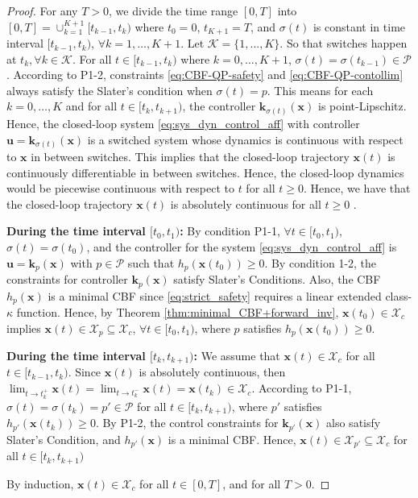 \documentclass[letterpaper, 10 pt, conference]{ieeeconf}  %
\begin{document}
\begin{proof}
    For any $T>0$, we divide the time range $[0, T]$ into $[0, T]=\cup_{k=1}^{K+1}[t_{k-1}, t_k)$ where $t_0=0$, $t_{K+1}=T$, and $\sigma(t)$ is constant in time interval $[t_{k-1}, t_k)$, $\forall k=1,\dots,K+1$. Let $\mathcal{K}=\{1,...,K\}$. So that switches happen at $t_k, \forall k\in\mathcal{K}$. For all $t \in [t_{k-1}, t_k)$ where $k=0,\dots,K+1$, $\sigma(t)=\sigma(t_{k-1})\in\mathcal{P}$. According to P1-2, constraints \eqref{eq:CBF-QP-safety} and \eqref{eq:CBF-QP-contollim} always satisfy the Slater's condition when $\sigma(t)=p$. This means for each $k=0,\dots,K$ and for all $t\in[t_k, t_{k+1})$, the controller $\mathbf{k}_{\sigma(t)}(\mathbf{x})$ is point-Lipschitz. Hence, the closed-loop system \eqref{eq:sys_dyn_control_aff} with controller $\mathbf{u}=\mathbf{k}_{\sigma(t)}(\mathbf{x})$ is a switched system \cite[Part-III]{liberzon2003switching} whose dynamics is continuous with respect to $\mathbf{x}$ in between switches. This implies that the closed-loop trajectory $\mathbf{x}(t)$ is continuously differentiable in between switches. Hence, the closed-loop dynamics would be piecewise continuous with respect to $t$ for all $t\geq 0$. Hence, we have that the closed-loop trajectory $\mathbf{x}(t)$ is absolutely continuous for all $t\geq 0$ \cite[Chapter~1.2]{liberzon2003switching}.
    
    \textbf{During the time interval $[t_0, t_1)$: } By condition P1-1, $\forall t \in[t_0, t_1)$, $\sigma(t) = \sigma(t_0)$, and the controller for the system \eqref{eq:sys_dyn_control_aff} is $\mathbf{u}=\mathbf{k}_p(\mathbf{x})$ with $p\in\mathcal{P}$ such that $h_p(\mathbf{x}(t_0))\geq 0$. By condition 1-2, the constraints for controller $\mathbf{k}_p(\mathbf{x})$ satisfy Slater's Conditions. Also, the CBF $h_p(\mathbf{x})$ is a minimal CBF since \eqref{eq:strict_safety} requires a linear extended class-$\kappa$ function. Hence, by Theorem \ref{thm:minimal_CBF+forward_inv}, $\mathbf{x}(t_0)\in\mathcal{X}_c$ implies $\mathbf{x}(t)\in\mathcal{X}_p\subseteq\mathcal{X}_c$, $\forall t\in[t_0, t_1)$, where $p$ satisfies $h_p(\mathbf{x}(t_0))\geq 0$. 

    \textbf{During the time interval $[t_k, t_{k+1})$: } We assume that $\mathbf{x}(t)\in\mathcal{X}_c$ for all $t\in[t_{k-1}, t_{k})$. Since $\mathbf{x}(t)$ is absolutely continuous, then $\lim_{t\rightarrow t_{k}^+}\mathbf{x}(t) = \lim_{t\rightarrow t_{k}^-}\mathbf{x}(t)=\mathbf{x}(t_k)\in\mathcal{X}_c$. According to P1-1, $\sigma(t)=\sigma(t_k)=p'\in\mathcal{P}$ for all $t\in[t_{k}, t_{k+1})$, where $p'$ satisfies $h_{p'}(\mathbf{x}(t_k))\geq 0$. By P1-2, the control constraints for $\mathbf{k}_{p'}(\mathbf{x})$ also satisfy Slater's Condition, and $h_{p'}(\mathbf{x})$ is a minimal CBF. Hence, $\mathbf{x}(t)\in\mathcal{X}_{p'}\subseteq\mathcal{X}_c$ for all $t\in[t_{k}, t_{k+1})$ 

    By induction, $\mathbf{x}(t)\in\mathcal{X}_c$ for all $t\in[0, T]$, and for all $T>0$.
\end{proof}
\end{document}
